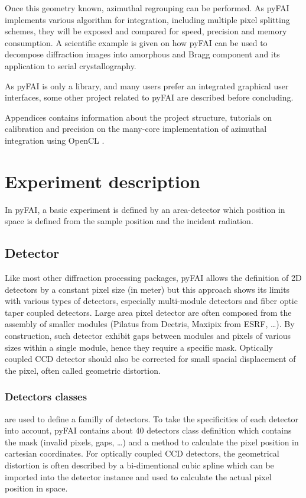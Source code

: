 \documentclass[preprint]{iucr}
\begin{document}
Once this geometry known, azimuthal regrouping can be performed. 
As pyFAI implements various algorithm for integration, including 
multiple pixel splitting schemes, they will be exposed and compared
for speed, precision and memory consumption.
A scientific example is given on how pyFAI can be used to decompose 
diffraction images into amorphous and Bragg component and its application
to serial crystallography.

As pyFAI is only a library, and many users prefer an integrated graphical user
interfaces, some other project related to pyFAI are described before concluding.

Appendices contains information about the project structure, tutorials on
calibration and precision on the many-core implementation of azimuthal
integration using OpenCL \cite{OpenCL}.
 
\section{Experiment description}
In pyFAI, a basic experiment is defined by an area-detector which position in
space is defined from the sample position and the incident radiation.

\subsection{Detector}
Like most other diffraction processing packages, pyFAI allows the definition of
2D detectors by a constant pixel size (in meter) but this approach shows its limits
with various types of detectors, especially multi-module detectors and fiber
optic taper coupled detectors. Large area pixel detector are often composed from
the assembly of smaller modules (Pilatus from Dectris, Maxipix from ESRF, \ldots). 
By construction, such detector exhibit gaps between modules and pixels of
various sizes within a single module, hence they require a specific mask.
Optically coupled CCD detector should also be corrected
for small spacial displacement of the pixel, often called geometric distortion.

\subsubsection{Detectors classes} are used to define a familly of detectors. 
To take the specificities of each detector into account, pyFAI contains about
40 detectors class definition which contains the mask (invalid pixels, gaps,
\ldots) and a method to calculate the pixel position in cartesian coordinates.
For optically coupled CCD detectors, the geometrical distortion is often
described by a bi-dimentional cubic spline which can be imported into
the detector instance and used to calculate the actual pixel position in space.
\end{document}
